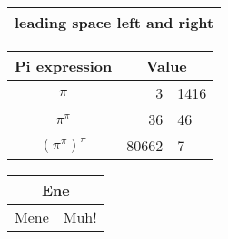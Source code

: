 \documentclass[a4paper, 11pt]{article}
\begin{document}
\begin{tabular}{l}
\hline
  leading space left and right\\
\hline
\end{tabular}



\begin{tabular}{c r @{.} l}
Pi expression  &
\multicolumn{2}{c}{Value} \\
\hline
$\pi$            &   3&1416 \\
$\pi^{\pi}$        & 36&46 \\
$(\pi^{\pi})^{\pi}$ & 80662&7 \\
\end{tabular}

\begin{tabular}{|c|c|}
\hline
\multicolumn{2}{|c|}{Ene} \\
\hline
Mene & Muh! \\
\hline
\end{tabular}
\end{document}
